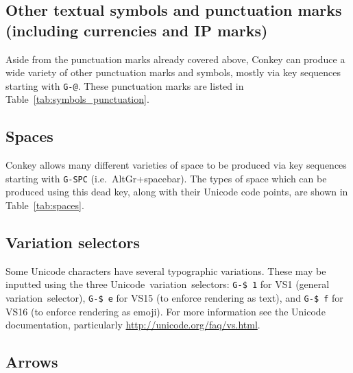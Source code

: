 \documentclass[oneside]{memoir}
\newcommand{\key}{\verb}
\begin{document}
{{{\subsection{Other textual symbols and punctuation marks (including currencies and IP marks)}
\label{sec:symbols_punctuation}

Aside from the punctuation marks already covered above,
  Conkey can produce a wide variety of other punctuation marks and symbols,
  mostly via key sequences starting with \key|G-@|.
These punctuation marks are listed in Table~\ref{tab:symbols_punctuation}.

\subsection{Spaces}
\label{sec:spaces}

Conkey allows many different varieties of space to be produced via key sequences starting with \key|G-SPC| (i.e.\ AltGr+spacebar).
The types of space which can be produced using this dead key, along with their Unicode code points,
  are shown in Table~\ref{tab:spaces}.

\subsection{Variation selectors}
\label{sec:selectors}

Some Unicode characters have several typographic variations.
These may be inputted using the three Unicode~variation~selectors:
  \key|G-$ 1| for VS1 (general variation~selector), \key|G-$ e| for VS15 (to enforce rendering as text), and \key|G-$ f| for VS16 (to enforce rendering as emoji).
For more information see the Unicode documentation, particularly \url{http://unicode.org/faq/vs.html}.

\subsection{Arrows}
\label{sec:arrows}

}}}
\end{document}
